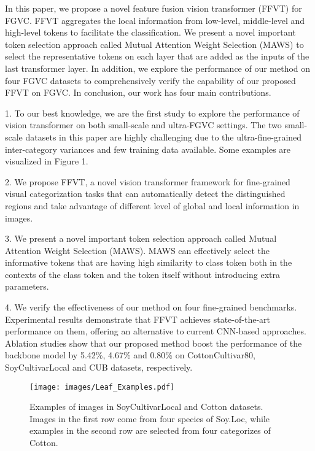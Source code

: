 \documentclass{bmvc2k}
\begin{document}
\par  
In this paper, we propose a novel feature fusion vision transformer (FFVT) for FGVC. FFVT aggregates the local information from low-level, middle-level and high-level tokens to facilitate the classification. We present a novel important token selection approach called Mutual Attention Weight Selection (MAWS) to select the representative tokens on each layer that are added as the inputs of the last transformer layer. In addition, we explore the performance of our method on four FGVC datasets to comprehensively verify the capability of our proposed FFVT on FGVC. In conclusion, our work has four main contributions. 
\par
1. To our best knowledge, we are the first study to explore the performance of vision transformer on both small-scale and ultra-FGVC settings. The two small-scale datasets in this paper are highly challenging due to the ultra-fine-grained inter-category variances and few training data available. Some examples are visualized in Figure 1.
\par
2. We propose FFVT, a novel vision transformer framework for fine-grained visual categorization tasks that can automatically detect the distinguished regions and take advantage of different level of global and local information in images.
\par
3. We present a novel important token selection approach called Mutual Attention Weight Selection (MAWS). MAWS can effectively select the informative tokens that are having  high similarity to class token both in the contexts of the class token and the token itself without introducing extra parameters. 
\par
4. We verify the effectiveness of our method on four fine-grained benchmarks. Experimental results demonstrate that FFVT achieves state-of-the-art performance on them, offering an alternative to current CNN-based approaches. Ablation studies show that our proposed method boost the performance of the backbone model by 5.42\%, 4.67\% and 0.80\% on  CottonCultivar80, SoyCultivarLocal and CUB datasets, respectively. 

\begin{figure*}[ht]   
    \centering 
    \texttt{[image: images/Leaf\_Examples.pdf]} 
    \caption{Examples of images in SoyCultivarLocal and Cotton datasets. Images in the first row come from four species of Soy.Loc, while examples in the second row are selected from four categorizes of Cotton. }    
    \label{Leaves_Examples}  
\end{figure*}
\end{document}
